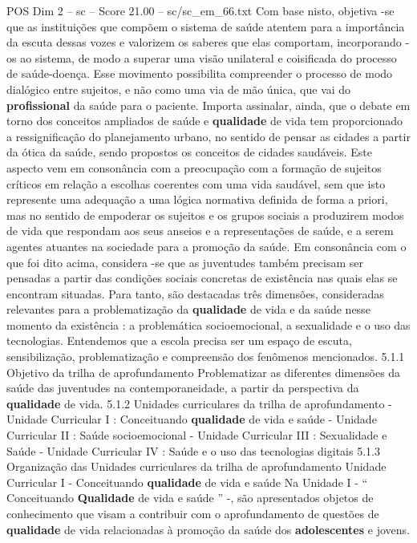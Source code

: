 \begin{textsample}{POS Dim 2 – sc – Score 21.00 – sc/sc\_em\_66.txt}
Com base nisto, objetiva -se que as instituições que compõem o sistema de saúde atentem para a importância da escuta dessas vozes e valorizem os saberes que elas comportam, incorporando -os ao sistema, de modo a superar uma visão unilateral e coisificada do processo de saúde-doença.
Esse movimento possibilita compreender o processo de modo dialógico entre sujeitos, e não como uma via de mão única, que vai do \textbf{profissional} da saúde para o paciente.
Importa assinalar, ainda, que o debate em torno dos conceitos ampliados de saúde e \textbf{qualidade} de vida tem proporcionado a ressignificação do planejamento urbano, no sentido de pensar as cidades a partir da ótica da saúde, sendo propostos os conceitos de cidades saudáveis.
Este aspecto vem em consonância com a preocupação com a formação de sujeitos críticos em relação a escolhas coerentes com uma vida saudável, sem que isto represente uma adequação a uma lógica normativa definida de forma a priori, mas no sentido de empoderar os sujeitos e os grupos sociais a produzirem modos de vida que respondam aos seus anseios e a representações de saúde, e a serem agentes atuantes na sociedade para a promoção da saúde.
Em consonância com o que foi dito acima, considera -se que as juventudes também precisam ser pensadas a partir das condições sociais concretas de existência nas quais elas se encontram situadas.
Para tanto, são destacadas três dimensões, consideradas relevantes para a problematização da \textbf{qualidade} de vida e da saúde nesse momento da existência : a problemática socioemocional, a sexualidade e o uso das tecnologias.
Entendemos que a escola precisa ser um espaço de escuta, sensibilização, problematização e compreensão dos fenômenos mencionados. 5.1.1 Objetivo da trilha de aprofundamento Problematizar as diferentes dimensões da saúde das juventudes na contemporaneidade, a partir da perspectiva da \textbf{qualidade} de vida. 5.1.2 Unidades curriculares da trilha de aprofundamento - Unidade Curricular I : Conceituando \textbf{qualidade} de vida e saúde - Unidade Curricular II : Saúde socioemocional - Unidade Curricular III : Sexualidade e Saúde - Unidade Curricular IV : Saúde e o uso das tecnologias digitais 5.1.3 Organização das Unidades curriculares da trilha de aprofundamento Unidade Curricular I - Conceituando \textbf{qualidade} de vida e saúde Na Unidade I - “ Conceituando \textbf{Qualidade} de vida e saúde ” -, são apresentados objetos de conhecimento que visam a contribuir com o aprofundamento de questões de \textbf{qualidade} de vida relacionadas à promoção da saúde dos \textbf{adolescentes} e jovens.

\end{textsample}
